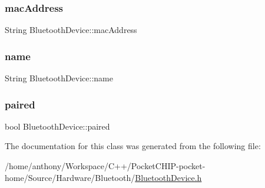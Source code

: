 \subsubsection{\texorpdfstring{mac\+Address}{macAddress}}
{\footnotesize\ttfamily String Bluetooth\+Device\+::mac\+Address}

\mbox{\label{classBluetoothDevice_accb2b8cf46501c6482dfd682cd64c410}} 
\subsubsection{\texorpdfstring{name}{name}}
{\footnotesize\ttfamily String Bluetooth\+Device\+::name}

\mbox{\label{classBluetoothDevice_ab7b0da26a809343fbad8cb49f9ef692b}} 
\subsubsection{\texorpdfstring{paired}{paired}}
{\footnotesize\ttfamily bool Bluetooth\+Device\+::paired}



The documentation for this class was generated from the following file\+:\begin{DoxyCompactItemize}
\item 
/home/anthony/\+Workspace/\+C++/\+Pocket\+C\+H\+I\+P-\/pocket-\/home/\+Source/\+Hardware/\+Bluetooth/\mbox{\hyperlink{BluetoothDevice_8h}{Bluetooth\+Device.\+h}}\end{DoxyCompactItemize}
